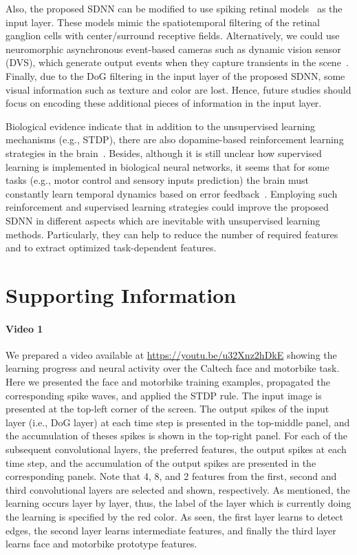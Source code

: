 \documentclass[preprint,5p,12pt,twocolumn]{article}
\begin{document}
Also, the proposed SDNN can be modified to use spiking retinal models~\cite{Wohrer2009,Martinez-Canada2016} as the input layer. These models mimic the spatiotemporal filtering  of the retinal ganglion cells with center/surround receptive fields. Alternatively, we could use neuromorphic asynchronous event-based cameras such as dynamic vision sensor (DVS), which generate output events when they capture transients in the scene~\cite{Lichtsteiner2007}. Finally, due to the DoG filtering in the input layer of the proposed SDNN, some visual information such as texture and color are lost. Hence, future studies should focus on encoding these additional pieces of information in the input layer.

Biological evidence indicate that in addition to the unsupervised learning mechanisms (e.g., STDP), there are also dopamine-based reinforcement learning strategies in the brain~\cite{pignatelli2015role}. Besides, although it is still unclear how supervised learning is implemented in biological neural networks,  it seems that for some tasks (e.g., motor control and sensory inputs prediction) the brain must constantly learn temporal dynamics based on error feedback~\cite{doya2000complementary}. Employing such reinforcement and supervised learning strategies could improve the proposed SDNN in different aspects which are inevitable with unsupervised learning methods. Particularly, they can help to reduce the number of required features and to extract optimized task-dependent features.


\section*{Supporting Information}


\paragraph*{Video 1}
\label{S1_Video}
We prepared a video available at \url{https://youtu.be/u32Xnz2hDkE} showing the learning progress and neural activity over the Caltech face and motorbike task. Here we presented the face and motorbike training examples,
propagated the corresponding spike waves, and applied the STDP
rule. The input image is presented at the top-left corner of the screen. The output spikes of the input layer (i.e., DoG layer) at each time step is presented in the top-middle panel, and the accumulation of theses spikes is shown in the top-right panel. For each of the subsequent convolutional layers, the preferred features, the output spikes at each time step, and the accumulation of the output spikes are presented in the corresponding panels. Note that 4, 8, and 2 features from the first, second and third convolutional layers are selected and shown, respectively. As mentioned, the learning occurs layer by layer, thus, the label of the layer which is currently doing the learning is specified by the red color. As seen, the first layer learns to detect edges, the second layer learns intermediate features, and finally the third layer learns face and motorbike prototype features.
\end{document}
